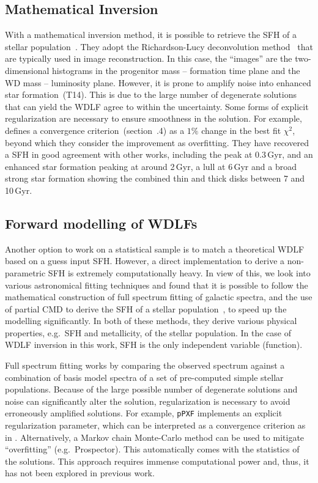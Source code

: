 \documentclass[fleqn,usenatbib]{mnras}
\begin{document}
\subsection{Mathematical Inversion}
\label{sec:inversion}
With a mathematical inversion method, it is possible to retrieve the SFH of a
stellar population~\citep{2013MNRAS.434.1549R}. They adopt the Richardson-Lucy 
deconvolution method~\citep{1972JOSA...62...55R, 1974AJ.....79..745L} that are typically used in image reconstruction. In this
case, the ``images'' are the two-dimensional histograms in the
progenitor mass -- formation time plane and the WD mass -- luminosity plane. 
However, it is prone to amplify noise into enhanced star 
formation~(T14). This is due to the large number of
degenerate solutions that can yield the WDLF agree to within the uncertainty.
Some forms of explicit regularization are necessary to ensure smoothness in the
solution. For example, \citet{2013MNRAS.434.1549R} defines a convergence
criterion~(section~.4) as a $1\%$ change in the best fit
$\chi^2$, beyond which they consider the improvement as overfitting. They have 
recovered a SFH in good agreement with other works, including the peak at
0.3\,Gyr, and an enhanced star formation peaking at around 2\,Gyr, a lull at
6\,Gyr and a broad strong star formation showing the combined thin and thick
disks between 7 and 10\,Gyr.

\subsection{Forward modelling of WDLFs}
Another option to work on a statistical sample is to match a theoretical
WDLF based on a guess input SFH. However, a direct implementation to derive a
non-parametric SFH is extremely computationally heavy. In view of this, we look
into various astronomical fitting techniques and found that it is possible to
follow the mathematical construction of full spectrum fitting of galactic
spectra, and the use of partial CMD to derive the SFH of a stellar
population~\citep{2006A&A...459..783C}, to speed up the modelling significantly.
In both of these methods, they derive various physical properties, e.g.\ SFH and
metallicity, of the stellar population. In the case of WDLF inversion in this
work, SFH is the only independent variable (function).

Full spectrum fitting works by comparing the observed spectrum against a
combination of basis model spectra of a set of pre-computed simple stellar
populations. Because of the large possible number of degenerate solutions and
noise can significantly alter the solution, regularization is necessary to
avoid erroneously amplified solutions. For example, \texttt{pPXF} implements an
explicit regularization parameter, which can be interpreted as a convergence
criterion as in \citet{2013MNRAS.434.1549R}. Alternatively, a Markov chain
Monte-Carlo method can be used to mitigate ``overfitting'' (e.g.\ Prospector).
This automatically comes with the statistics of the solutions. This approach
requires immense computational power and, thus, it has not been explored in
previous work.
\end{document}

